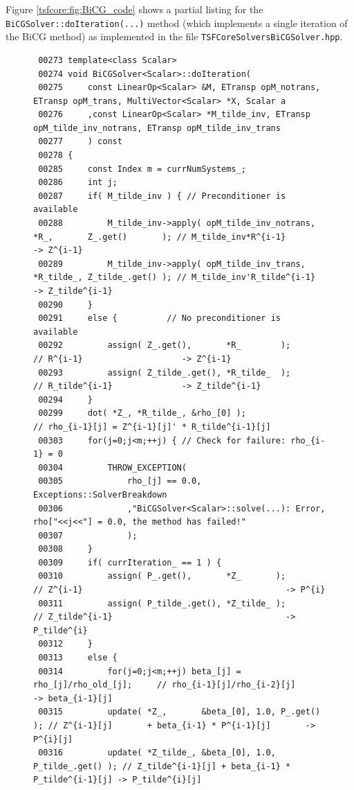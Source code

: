 Figure \ref{tsfcore:fig:BiCG_code} shows a partial listing for the
\texttt{BiCGSolver\-::doIteration(...)} method (which implements
a single iteration of the BiCG method) as implemented in the file
\texttt{TSFCore\-Solvers\-BiCG\-Solver.hpp}.
%
{\bsinglespace
\begin{figure}
\begin{minipage}{\textwidth}
{\tiny\begin{verbatim}
 00273 template<class Scalar>
 00274 void BiCGSolver<Scalar>::doIteration(
 00275     const LinearOp<Scalar> &M, ETransp opM_notrans, ETransp opM_trans, MultiVector<Scalar> *X, Scalar a
 00276     ,const LinearOp<Scalar> *M_tilde_inv, ETransp opM_tilde_inv_notrans, ETransp opM_tilde_inv_trans
 00277     ) const
 00278 {
 00285     const Index m = currNumSystems_;
 00286     int j;
 00287     if( M_tilde_inv ) { // Preconditioner is available
 00288         M_tilde_inv->apply( opM_tilde_inv_notrans, *R_,       Z_.get()       ); // M_tilde_inv*R^{i-1}        -> Z^{i-1}
 00289         M_tilde_inv->apply( opM_tilde_inv_trans,   *R_tilde_, Z_tilde_.get() ); // M_tilde_inv'R_tilde^{i-1}  -> Z_tilde^{i-1}
 00290     }
 00291     else {          // No preconditioner is available
 00292         assign( Z_.get(),       *R_        );                                    // R^{i-1}                    -> Z^{i-1}
 00293         assign( Z_tilde_.get(), *R_tilde_  );                                    // R_tilde^{i-1}              -> Z_tilde^{i-1}
 00294     }
 00299     dot( *Z_, *R_tilde_, &rho_[0] );                       // rho_{i-1}[j] = Z^{i-1}[j]' * R_tilde^{i-1}[j]
 00303     for(j=0;j<m;++j) { // Check for failure: rho_{i-1} = 0
 00304         THROW_EXCEPTION(
 00305             rho_[j] == 0.0, Exceptions::SolverBreakdown
 00306             ,"BiCGSolver<Scalar>::solve(...): Error, rho["<<j<<"] = 0.0, the method has failed!"
 00307             );
 00308     }
 00309     if( currIteration_ == 1 ) {
 00310         assign( P_.get(),       *Z_       );                 // Z^{i-1}                                         -> P^{i}
 00311         assign( P_tilde_.get(), *Z_tilde_ );                 // Z_tilde^{i-1}                                   -> P_tilde^{i}
 00312     }
 00313     else {
 00314         for(j=0;j<m;++j) beta_[j] = rho_[j]/rho_old_[j];     // rho_{i-1}[j]/rho_{i-2}[j]                        -> beta_{i-1}[j]
 00315         update( *Z_,       &beta_[0], 1.0, P_.get()       ); // Z^{i-1}[j]       + beta_{i-1} * P^{i-1}[j]       -> P^{i}[j]
 00316         update( *Z_tilde_, &beta_[0], 1.0, P_tilde_.get() ); // Z_tilde^{i-1}[j] + beta_{i-1} * P_tilde^{i-1}[j] -> P_tilde^{i}[j]

\end{verbatim}}
\end{minipage}
\end{figure}}
